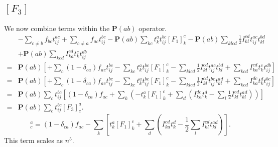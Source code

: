 \documentclass[graybox,sectrefs,envcountresetchap,open=right]{svmonodo}
\begin{document}
\subsection{$[F_3]$}
We now combine terms within the $\mathbf{P}(ab)$ operator.
\begin{align}
& - \sum_{c \not= b} f_{bc} t_{ij}^{ac}
+ \sum_{c \not= a} f_{ac} t_{ij}^{bc}
- \mathbf{P}(ab) \sum_{kc} t_k^a t_{ij}^{bc} [F_1]_k^c
- \mathbf{P}(ab) \sum_{klcd} \frac{1}{2} I_{kl}^{cd} t_{ij}^{ac} t_{kl}^{bd}
\nonumber \\ &
+ \mathbf{P}(ab) \sum_{kcd} I_{ka}^{cd} t_k^c t_{ij}^{db} \nonumber \\
= &
\mathbf{P}(ab) \left[
+ \sum_c (1-\delta_{ca}) f_{ac} t_{ij}^{bc}
- \sum_{kc} t_k^a t_{ij}^{bc} [F_1]_k^c
- \sum_{klcd} \frac{1}{2} I_{kl}^{cd} t_{ij}^{ac} t_{kl}^{bd}
+ \sum_{kcd} I_{ka}^{cd} t_k^c t_{ij}^{db} 
\right]
\nonumber \\
= &
\mathbf{P}(ab) \left[
+ \sum_c (1-\delta_{ca}) f_{ac} t_{ij}^{bc}
- \sum_{kc} t_k^a t_{ij}^{bc} [F_1]_k^c
- \sum_{klcd} \frac{1}{2} I_{kl}^{cd} t_{ij}^{bc} t_{kl}^{ad}
+ \sum_{kcd} I_{ka}^{dc} t_k^d t_{ij}^{bc} 
\right]
\nonumber \\
= &
\mathbf{P}(ab) \sum_c t_{ij}^{bc}
\left[
(1-\delta_{ca}) f_{ac}
+ \sum_{k} \left( - t_k^a [F_1]_k^c
+ \sum_{d} \left( I_{ka}^{dc} t_k^d 
- \sum_{l} \frac{1}{2} I_{kl}^{cd} t_{kl}^{ad} \right) \right)
\right] \nonumber \\
= &
\mathbf{P}(ab) \sum_c t_{ij}^{bc} [F_3]_c^a .
\end{align}
\begin{equation}
[F_3]_c^a = (1-\delta_{ca}) f_{ac}
- \sum_{k} \left[ t_k^a [F_1]_k^c
+ \sum_{d} \left( I_{ka}^{cd} t_k^d 
- \frac{1}{2} \sum_{l} I_{kl}^{cd} t_{kl}^{ad} \right) \right] . \label{intermedF3}
\end{equation}
This term scales as $n^5$.
\end{document}
